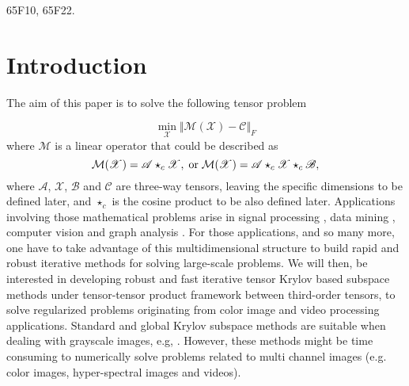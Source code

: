 \documentclass{siamltex}
\newcommand{\1}{\mathbb{1}}
\newcommand{\0}{\mathbb{0}}
\begin{document}
	
	
	
	\medskip
	
	 { 65F10, 65F22. }
	
	
	
	
	\section{Introduction}
	The aim of this paper is to solve the following tensor problem
	
	\begin{equation}\label{eq1}
\displaystyle \min_{\mathscr{X}} \Vert 	{\mathcal M} (\mathscr{X})-  \mathscr{C} \Vert_F
	\end{equation}
	where  ${\mathcal M}$ is a linear operator  that could be described as 
	\begin{equation}\label{eq2}
	{\mathcal M} (\mathscr{X}) = \mathscr{A} \star_c\mathscr{X},\; {\rm or}\; 	{\mathcal M} (\mathscr{X}) = \mathscr{A} \star_c\mathscr{X}\star_c\mathscr{B},
	\end{equation}
	where $\mathscr{A}$, $\mathscr{X}$, $\mathscr{B}$ and $\mathscr{C}$ are  three-way tensors, leaving the specific dimensions to be defined later,  and $\star_c$ is the cosine product to be also defined later. Applications involving those mathematical problems arise in  signal processing \cite{lb},  data mining \cite{lxnm},  computer vision \cite{vt1, vt2} and graph analysis \cite{kolda2}.  For those applications, and so many more, one  have to take advantage of this multidimensional structure to build rapid and robust iterative methods for solving large-scale problems. We will then, be  interested
	in  developing robust and fast iterative  tensor  Krylov based subspace methods under tensor-tensor product framework between third-order
	tensors, to solve regularized problems originating from color image and  video processing applications. Standard and global Krylov subspace methods are suitable  when dealing with grayscale images, e.g, \cite{belguide, belguide2, reichel2,reichel1}. However, these methods might be time consuming to numerically solve problems related to multi channel images (e.g. color images, hyper-spectral images and videos). \\
	
\end{document}
